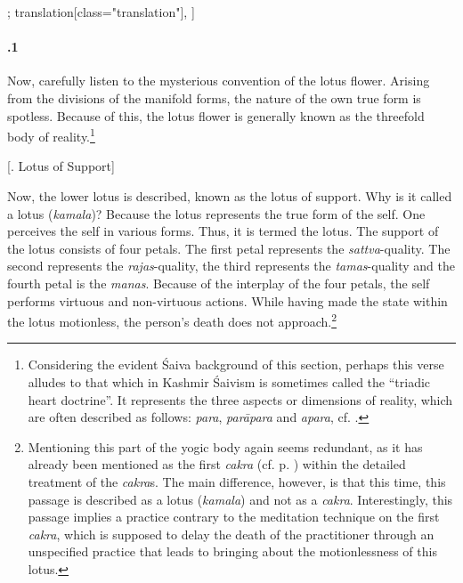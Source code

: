 \begin{alignment}[
  texts=edition[class="edition"];
  translation[class="translation"],
  ]
\begin{translation}
\begin{tlate}
     \paragraph{.1} Now, carefully listen to the mysterious convention of the lotus flower. Arising from the divisions of the manifold forms, the nature of the own true form is spotless. Because of this, the lotus flower is generally known as the threefold body of reality.\footnote{Considering the evident Śaiva background of this section, perhaps this verse alludes to that which in Kashmir Śaivism is sometimes called the ``triadic heart doctrine''. It represents the three aspects or dimensions of reality, which are often described as follows: \textit{para}, \textit{parāpara} and \textit{apara}, cf. \citeauthor[1989]{triadicheart}.}   
     \end{tlate}
      \bigskip
      \centerline{\textrm{\small{[. Lotus of Support]}}}
      \bigskip
      \begin{tlate}
      Now, the lower lotus is described, known as the lotus of support. Why is it called a lotus (\textit{kamala})? Because the lotus represents the true form of the self. One perceives the self in various forms. Thus, it is termed the
      lotus. The support of the lotus consists of four petals. The first petal represents the \textit{sattva}-quality. The second represents the \textit{rajas}-quality, the third represents the \textit{tamas}-quality and the fourth petal is the \textit{manas}. Because of the interplay of the four petals, the self performs virtuous and non-virtuous actions. While having made the state within the lotus motionless, the person's death does not approach.\footnote{Mentioning this part of the yogic body again seems redundant, as it has already been mentioned as the first \textit{cakra} (cf. p. \pageref{cakra1}) within the detailed treatment of the \textit{cakra}s. The main difference, however, is that this time, this passage is described as a lotus (\textit{kamala}) and not as a \textit{cakra}. Interestingly, this passage implies a practice contrary to the meditation technique on the first \textit{cakra}, which is supposed to delay the death of the practitioner through an unspecified practice that leads to bringing about the motionlessness of this lotus.}
    \end{tlate}
  \end{translation}
\end{alignment}
\pagebreak %
